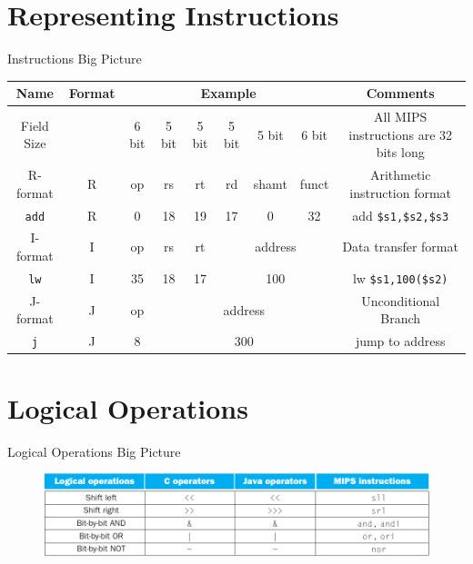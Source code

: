 \section{Representing Instructions}
\begin{frame}{Instructions Big Picture}
\begin{table}[H]
\begin{adjustbox}{width=\textwidth}
\begin{tabular}{|c|c|c|c|c|c|c|c|c|}
\hline
Name & Format & \multicolumn{6}{|c|}{Example} & Comments \\
\hline
\hline
Field Size && 6 bit & 5 bit & 5 bit & 5 bit & 5 bit & 6 bit & All MIPS instructions are 32 bits long \\
\hline
R-format & R & op & rs & rt & rd & shamt & funct & Arithmetic instruction format \\
\hline
\texttt{add} & R & 0 & 18 & 19 & 17 & 0 & 32 & add \texttt{\$s1,\$s2,\$s3} \\
\hline
I-format & I & op & rs & rt & \multicolumn{3}{|c|}{address} & Data transfer format\\
\hline
\texttt{lw} & I & 35 & 18 & 17 & \multicolumn{3}{|c|}{100} & lw \texttt{\$s1,100(\$s2)} \\
\hline
J-format & J & op & \multicolumn{5}{|c|}{address} & Unconditional Branch \\
\hline
\texttt{j} & J & 8 & \multicolumn{5}{|c|}{300} & jump to address \\
\hline
\end{tabular}
\end{adjustbox}
\end{table}
\end{frame}

\section{Logical Operations}
\begin{frame}{Logical Operations Big Picture}
\begin{figure}
\begin{center}
\includegraphics[width=\textwidth, height=0.4\textheight]{docs/images/logical}
\end{center}
\end{figure}
\end{frame}

